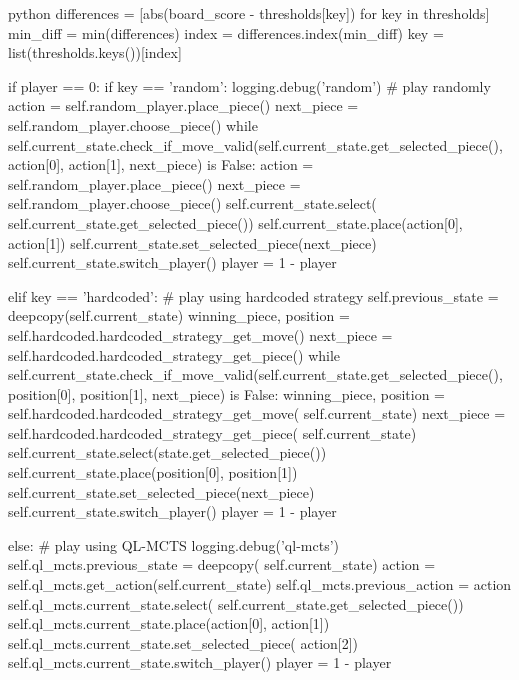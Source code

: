 \begin{mintedbox}{python}
                differences = [abs(board_score - thresholds[key])
                                for key in thresholds]
                min_diff = min(differences)
                index = differences.index(min_diff)
                key = list(thresholds.keys())[index]

                if player == 0:
                    if key == 'random':
                        logging.debug('random')
                        # play randomly
                        action = self.random_player.place_piece()
                        next_piece = self.random_player.choose_piece()
                        while self.current_state.check_if_move_valid(self.current_state.get_selected_piece(), action[0], action[1], next_piece) is False:
                            action = self.random_player.place_piece()
                            next_piece = self.random_player.choose_piece()
                        self.current_state.select(
                            self.current_state.get_selected_piece())
                        self.current_state.place(action[0], action[1])
                        self.current_state.set_selected_piece(next_piece)
                        self.current_state.switch_player()
                        player = 1 - player

                    elif key == 'hardcoded':
                        # play using hardcoded strategy
                        self.previous_state = deepcopy(self.current_state)
                        winning_piece, position = self.hardcoded.hardcoded_strategy_get_move()
                        next_piece = self.hardcoded.hardcoded_strategy_get_piece()
                        while self.current_state.check_if_move_valid(self.current_state.get_selected_piece(), position[0], position[1], next_piece) is False:
                            winning_piece, position = self.hardcoded.hardcoded_strategy_get_move(
                                self.current_state)
                            next_piece = self.hardcoded.hardcoded_strategy_get_piece(
                                self.current_state)
                        self.current_state.select(state.get_selected_piece())
                        self.current_state.place(position[0], position[1])
                        self.current_state.set_selected_piece(next_piece)
                        self.current_state.switch_player()
                        player = 1 - player

                    else:
                        # play using QL-MCTS
                        logging.debug('ql-mcts')
                        self.ql_mcts.previous_state = deepcopy(
                            self.current_state)
                        action = self.ql_mcts.get_action(self.current_state)
                        self.ql_mcts.previous_action = action
                        self.ql_mcts.current_state.select(
                            self.current_state.get_selected_piece())
                        self.ql_mcts.current_state.place(action[0], action[1])
                        self.ql_mcts.current_state.set_selected_piece(
                            action[2])
                        self.ql_mcts.current_state.switch_player()
                        player = 1 - player


\end{mintedbox}
